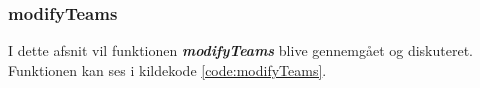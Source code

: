 \subsubsection{modifyTeams}\label{modifyTeamsAfsnit}
I dette afsnit vil funktionen \textbf{\textit{modifyTeams}} blive gennemgået og diskuteret. Funktionen kan ses i kildekode \ref{code:modifyTeams}.
